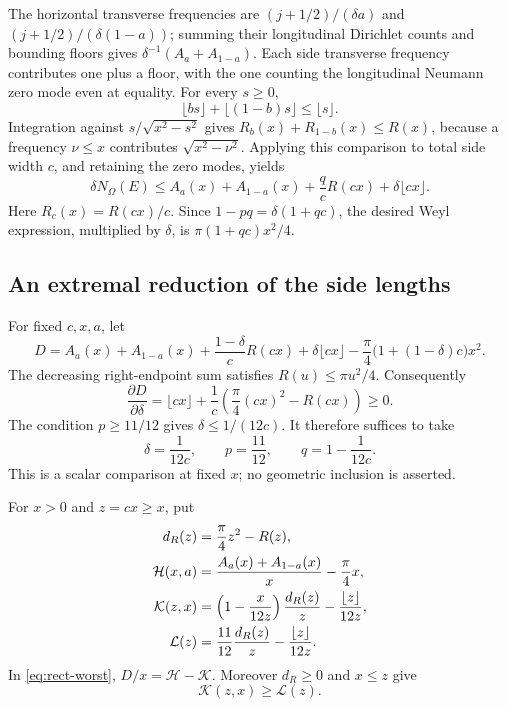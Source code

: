 \documentclass[11pt,reqno]{amsart}
\numberwithin{equation}{section}
\newcommand{\Om}{\Omega}
\begin{document}
The horizontal transverse frequencies are
$(j+1/2)/(\delta a)$ and $(j+1/2)/(\delta(1-a))$; summing
their longitudinal Dirichlet counts and bounding floors gives
$\delta^{-1}(A_a+A_{1-a})$. Each side transverse frequency
contributes one plus a floor, with the one counting the
longitudinal Neumann zero mode even at equality.
For every $s\ge0$,
\[
 \lfloor bs\rfloor+\lfloor(1-b)s\rfloor\le\lfloor s\rfloor.
\]
Integration against $s/\sqrt{x^2-s^2}$ gives
$R_b(x)+R_{1-b}(x)\le R(x)$, because a frequency $\nu\le x$
contributes $\sqrt{x^2-\nu^2}$. Applying this comparison to
total side width $c$, and retaining the zero modes, yields
\begin{equation}\label{eq:rect-mixed}
 \delta N_\Om(E)\le
 A_a(x)+A_{1-a}(x)+\frac q cR(cx)+\delta\lfloor cx\rfloor.
\end{equation}
Here $R_c(x)=R(cx)/c$. Since $1-pq=\delta(1+qc)$, the
desired Weyl expression, multiplied by $\delta$, is
$\pi(1+qc)x^2/4$.

\subsection*{An extremal reduction of the side lengths}

For fixed $c,x,a$, let
\begin{equation}\label{eq:rect-D}
 D=A_a(x)+A_{1-a}(x)+\frac{1-\delta}{c}R(cx)
       +\delta\lfloor cx\rfloor
       -\frac\pi4\bigl(1+(1-\delta)c\bigr)x^2.
\end{equation}
The decreasing right-endpoint sum satisfies $R(u)\le\pi u^2/4$.
Consequently
\[
 \frac{\partial D}{\partial\delta}
 =\lfloor cx\rfloor+\frac1c\left(\frac\pi4(cx)^2-R(cx)\right)
 \ge0.
\]
The condition $p\ge11/12$ gives $\delta\le1/(12c)$.
It therefore suffices to take
\begin{equation}\label{eq:rect-worst}
 \delta=\frac1{12c},\qquad p=\frac{11}{12},
 \qquad q=1-\frac1{12c}.
\end{equation}
This is a scalar comparison at fixed $x$; no geometric inclusion
is asserted.

For $x>0$ and $z=cx\ge x$, put
\begin{align}
 d_R(z)&=\frac\pi4z^2-R(z),\notag\\
 \mathcal H(x,a)&=\frac{A_a(x)+A_{1-a}(x)}x-\frac\pi4x,
       \label{eq:rect-HKL}\\
 \mathcal K(z,x)&=\left(1-\frac{x}{12z}\right)\frac{d_R(z)}z
                     -\frac{\lfloor z\rfloor}{12z},\notag\\
 \mathcal L(z)&=\frac{11}{12}\frac{d_R(z)}z
                     -\frac{\lfloor z\rfloor}{12z}.\notag
\end{align}
In \eqref{eq:rect-worst}, $D/x=\mathcal H-\mathcal K$.
Moreover $d_R\ge0$ and $x\le z$ give
\begin{equation}\label{eq:rect-KL}
 \mathcal K(z,x)\ge\mathcal L(z).
\end{equation}
\end{document}
